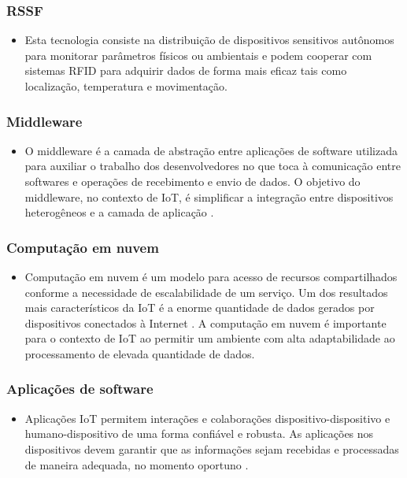 	\subsubsection{\acrfull{RSSF}}
		\begin{itemize}
			\item Esta tecnologia consiste na distribuição de dispositivos sensitivos autônomos para monitorar parâmetros físicos ou
			ambientais e podem cooperar com sistemas \acrshort{RFID} para adquirir dados de forma mais eficaz tais como localização, temperatura e movimentação.
			\cite{IOTS}
		\end{itemize}
	\subsubsection{Middleware}
		\begin{itemize}
			\item O middleware é a camada de abstração entre aplicações de software utilizada para auxiliar o trabalho dos desenvolvedores
			 no que toca à comunicação entre softwares e operações de recebimento e envio de dados. O objetivo do middleware, no contexto
			  de \acrshort{IoT}, é simplificar a integração entre dispositivos heterogêneos e a camada de aplicação \cite{middleware}.
		\end{itemize}
	\subsubsection{Computação em nuvem}
		\begin{itemize}
			\item Computação em nuvem é um modelo para acesso de recursos compartilhados conforme a necessidade de escalabilidade de um serviço. Um dos resultados mais característicos
			da \acrshort{IoT} é a enorme quantidade de dados gerados por dispositivos conectados à Internet \cite{IOTV}. A computação em nuvem é importante para o contexto de \acrlong{IoT}
			ao permitir um ambiente com alta adaptabilidade ao processamento de elevada quantidade de dados.
		\end{itemize}
	\subsubsection{Aplicações de software}
		\begin{itemize}
			\item Aplicações \acrshort{IoT} permitem interações e colaborações dispositivo-dispositivo e humano-dispositivo de uma forma confiável e robusta.
			As aplicações nos dispositivos devem garantir que as informações sejam recebidas e processadas de maneira adequada, no momento oportuno \cite{service}.
		\end{itemize}

